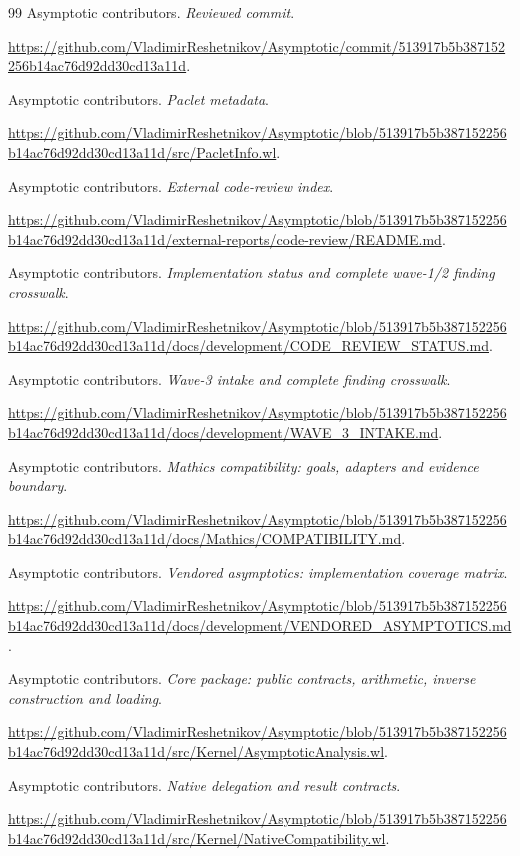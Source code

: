 \documentclass[11pt,letterpaper]{article}
\begin{document}
\begin{thebibliography}{99}
Asymptotic contributors. \emph{Reviewed commit}.\par
\url{https://github.com/VladimirReshetnikov/Asymptotic/commit/513917b5b387152256b14ac76d92dd30cd13a11d}.

Asymptotic contributors. \emph{Paclet metadata}.\par
\url{https://github.com/VladimirReshetnikov/Asymptotic/blob/513917b5b387152256b14ac76d92dd30cd13a11d/src/PacletInfo.wl}.

Asymptotic contributors. \emph{External code-review index}.\par
\url{https://github.com/VladimirReshetnikov/Asymptotic/blob/513917b5b387152256b14ac76d92dd30cd13a11d/external-reports/code-review/README.md}.

Asymptotic contributors. \emph{Implementation status and complete wave-1/2 finding crosswalk}.\par
\url{https://github.com/VladimirReshetnikov/Asymptotic/blob/513917b5b387152256b14ac76d92dd30cd13a11d/docs/development/CODE_REVIEW_STATUS.md}.

Asymptotic contributors. \emph{Wave-3 intake and complete finding crosswalk}.\par
\url{https://github.com/VladimirReshetnikov/Asymptotic/blob/513917b5b387152256b14ac76d92dd30cd13a11d/docs/development/WAVE_3_INTAKE.md}.

Asymptotic contributors. \emph{Mathics compatibility: goals, adapters and evidence boundary}.\par
\url{https://github.com/VladimirReshetnikov/Asymptotic/blob/513917b5b387152256b14ac76d92dd30cd13a11d/docs/Mathics/COMPATIBILITY.md}.

Asymptotic contributors. \emph{Vendored asymptotics: implementation coverage matrix}.\par
\url{https://github.com/VladimirReshetnikov/Asymptotic/blob/513917b5b387152256b14ac76d92dd30cd13a11d/docs/development/VENDORED_ASYMPTOTICS.md}.

Asymptotic contributors. \emph{Core package: public contracts, arithmetic, inverse construction and loading}.\par
\url{https://github.com/VladimirReshetnikov/Asymptotic/blob/513917b5b387152256b14ac76d92dd30cd13a11d/src/Kernel/AsymptoticAnalysis.wl}.

Asymptotic contributors. \emph{Native delegation and result contracts}.\par
\url{https://github.com/VladimirReshetnikov/Asymptotic/blob/513917b5b387152256b14ac76d92dd30cd13a11d/src/Kernel/NativeCompatibility.wl}.


\end{thebibliography}
\end{document}
